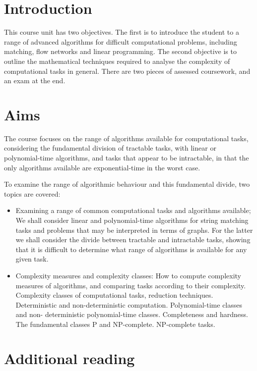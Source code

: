 \section*{Introduction}

This course unit has two objectives. The first is to introduce the student to a
range of advanced algorithms for difficult computational problems, including
matching, flow networks and linear programming. The second objective is to
outline the mathematical techniques required to analyse the complexity of
computational tasks in general. There are two pieces of assessed coursework, and
an exam at the end.

\section*{Aims}

The course focuses on the range of algorithms available for computational tasks,
considering the fundamental division of tractable tasks, with linear or
polynomial-time algorithms, and tasks that appear to be intractable, in that the
only algorithms available are exponential-time in the worst case.

To examine the range of algorithmic behaviour and this fundamental divide, two
topics are covered:

\begin{itemize}

  \item Examining a range of common computational tasks and algorithms available;
  We shall consider linear and polynomial-time algorithms for string matching
  tasks and problems that may be interpreted in terms of graphs. For the latter
  we shall consider the divide between tractable and intractable tasks, showing
  that it is difficult to determine what range of algorithms is available for
  any given task.

  \item Complexity measures and complexity classes: How to compute complexity
  measures of algorithms, and comparing tasks according to their complexity.
  Complexity classes of computational tasks, reduction techniques. Deterministic
  and non-deterministic computation. Polynomial-time classes and non-
  deterministic polynomial-time classes. Completeness and hardness. The
  fundamental classes P and NP-complete. NP-complete tasks.

\end{itemize}

\section*{Additional reading}

